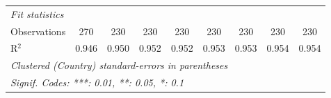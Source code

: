 \begin{table}[htbp]
\begin{tabular}{lcccccccc}
      \midrule \emph{Fit statistics}\\
      Observations                            & 270            & 230           & 230     & 230          & 230          & 230          & 230           & 230\\  
      R$^2$                                   & 0.946          & 0.950         & 0.952   & 0.952        & 0.953        & 0.953        & 0.954         & 0.954\\  
      \midrule
      \multicolumn{9}{l}{\emph{Clustered (Country) standard-errors in parentheses}}\\
      \multicolumn{9}{l}{\emph{Signif. Codes: ***: 0.01, **: 0.05, *: 0.1}}\\
   \end{tabular}
\end{table}


